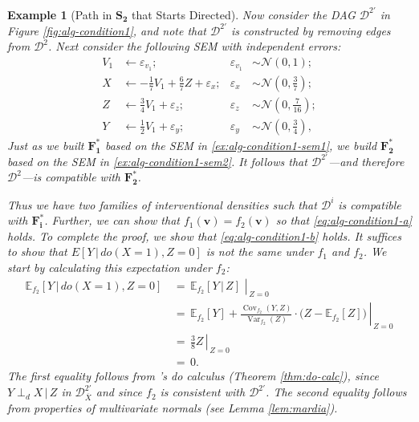 \documentclass[11pt]{article}
\DeclareMathOperator{\Var}{Var}
\DeclareMathOperator{\Cov}{Cov}
\newtheorem{example}{Example}
\newcommand{\mb}[1]{\mathbf{#1}}
\newcommand{\dsepp}{\perp_{d}}
\newcommand{\g}[1][G]{\mathcal{#1}}
\newcommand{\E}{\mathbb{E}}
\begin{document}
\begin{example}[Path in $\mb{S_2}$ that Starts Directed]
    Now consider the DAG $\g[D]^{2'}$ in Figure \ref{fig:alg-condition1}, and note that $\g[D]^{2'}$ is constructed by removing edges from $\g[D]^2$. Next consider the following SEM with independent errors:
    \begin{align}
        V_1       &\gets  \varepsilon_{v_1};                   &\varepsilon_{v_1} &\sim \mathcal{N}(0,1); \label{ex:alg-condition1-sem2}\\
        X   &\gets  {-\tfrac{1}{7}V_1} + \tfrac{6}{7} Z + \varepsilon_x;  &\varepsilon_x &\sim \mathcal{N}(0,\tfrac{3}{7}); \nonumber\\
        Z   &\gets  \tfrac{3}{4} V_1 + \varepsilon_z;    &\varepsilon_z &\sim \mathcal{N}(0,\tfrac{7}{16}); \nonumber\\
        Y   &\gets  \tfrac{1}{2} V_1 + \varepsilon_y;    &\varepsilon_y &\sim \mathcal{N}(0,\tfrac{3}{4}), \nonumber
    \end{align}
    Just as we built $\mb{F^*_1}$ based on the SEM in \eqref{ex:alg-condition1-sem1}, we build $\mb{F^*_2}$ based on the SEM in \eqref{ex:alg-condition1-sem2}. It follows that $\g[D]^{2'}$---and therefore $\g[D]^2$---is compatible with $\mb{F^*_2}$.


    Thus we have two families of interventional densities such that $\g[D]^i$ is compatible with $\mb{F^*_i}$. Further, we can show that $f_1(\mb{v})=f_2(\mb{v})$ so that \eqref{eq:alg-condition1-a} holds. To complete the proof, we show that \eqref{eq:alg-condition1-b} holds. It suffices to show that $E[Y \,|\, do(X=1), Z=0]$ is not the same under $f_1$ and $f_2$. We start by calculating this expectation under $f_2$:    
    \begin{align*}
        \E_{f_2}[Y \,|\, do(X=1), Z=0]
            &\,=\, \left. \E_{f_2}[Y \,|\, Z] \,\, \right\rvert_{\, Z=0}\\
            &\,=\, \left. \E_{f_2}[Y] + \frac{\Cov_{f_2}(Y,Z)}{\Var_{f_2}(Z)} \cdot \Big(Z - \E_{f_2}[Z]\Big) \, \right\rvert_{\, Z=0}\\
            &\,=\, \left. \tfrac{3}{8} Z \, \right\rvert_{\, Z=0}\\
            &\,=\, 0.
    \end{align*}
    The first equality follows from \citeauthor{pearl2009causality}'s do calculus (Theorem \ref{thm:do-calc}), since $Y \dsepp X \,|\, Z$ in $\g[D]^{2'}_{\overline{X}}$ and since $f_2$ is consistent with $\g[D]^{2'}$. The second equality follows from properties of multivariate normals (see Lemma \ref{lem:mardia}). 
    

\end{example}
\end{document}
